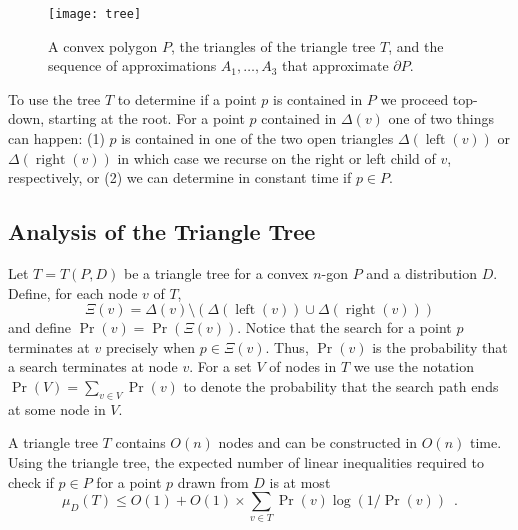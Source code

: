 \documentclass[charterfonts,lotsofwhite]{patmorin}
\newcommand{\boundary}{\partial}
\DeclareMathOperator{\lft}{left}
\DeclareMathOperator{\rght}{right}
\begin{document}
\begin{figure}
\begin{center}\texttt{[image: tree]}\end{center}
\caption{A convex polygon $P$, the triangles of the triangle 
tree $T$, and the sequence
of approximations $A_1,\ldots,A_3$ that approximate $\boundary P$.}
\end{figure}

To use the tree $T$ to determine if a point $p$ is contained in $P$ we
proceed top-down, starting at the root.  For a point $p$ contained in
$\Delta(v)$ one of two things can happen: (1) $p$ is contained in one
of the two open triangles $\Delta(\lft(v))$ or $\Delta(\rght(v))$ in
which case we recurse on the right or left child of $v$, respectively,
or (2) we can determine in constant time if $p\in P$.

\subsection{Analysis of the Triangle Tree}

Let $T=T(P,D)$ be a triangle tree for a convex $n$-gon $P$ and a distribution
$D$. Define, for each node $v$ of $T$,
\[
   \Xi(v)=\Delta(v)\setminus (\Delta(\lft(v))\cup \Delta(\rght(v)))
\]
and define $\Pr(v)=\Pr(\Xi(v))$.  Notice that the search for a point
$p$ terminates at $v$ precisely when $p\in\Xi(v)$.  Thus, $\Pr(v)$ is
the probability that a search terminates at node $v$.  For a set $V$
of nodes in $T$ we use the notation $\Pr(V)=\sum_{v\in V}\Pr(v)$ to
denote the probability that the search path ends at some node in $V$.

\begin{thm}
A triangle tree $T$ contains $O(n)$ nodes and can be constructed in
$O(n)$ time.
Using the triangle tree, the expected number of linear inequalities
required to check if $p\in P$ for a point $p$ drawn from $D$ is at
most
\[
 \mu_D(T) 
   \le O(1)+O(1)\times \sum_{v\in T}\Pr(v)\log(1/\Pr(v)) \enspace .
\]
\end{thm}
\end{document}
